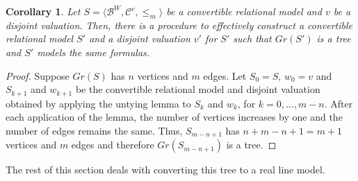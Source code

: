 \documentclass{article}
\newtheorem*{corollary}{Corollary}
\newcommand{\B}{\mathcal{B}}
\begin{document}
\begin{corollary}
  Let $S = \langle \B^W, \mathcal{C}^c, \leq_m \rangle$ be a convertible relational model and $v$ be a disjoint valuation.
  Then, there is a procedure to effectively construct a convertible relational model $S'$ and a disjoint valuation $v'$ for $S'$ such that $Gr(S')$ is a tree and $S'$ models the same formulas.
\end{corollary}
\begin{proof}
  Suppose $Gr(S)$ has $n$ vertices and $m$ edges. Let $S_0 = S$, $w_0 = v$ and $S_{k+1}$ and $w_{k+1}$ be the convertible relational model and disjoint valuation obtained by applying the untying lemma to $S_k$ and $w_k$, for $k = 0, \dots, m - n$.
  After each application of the lemma, the number of vertices increases by one and the number of edges remains the same. Thus, $S_{m - n + 1}$ has $n + m - n + 1 = m + 1$ vertices and $m$ edges and therefore $Gr(S_{m - n + 1})$ is a tree.
\end{proof}

The rest of this section deals with converting this tree to a real line model.
\end{document}
